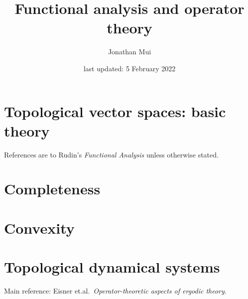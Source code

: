 \documentclass[11pt]{article}
\title{Functional analysis and operator theory}
\author{Jonathan Mui}
\date{last updated: 5 February 2022}
\begin{document}
	
	\maketitle
	
	\tableofcontents
	
	\section{Topological vector spaces: basic theory}
	References are to Rudin's \emph{Functional Analysis} unless otherwise stated.
	
	
	\section{Completeness}
	
	
	\section{Convexity}
	
	
	\section{Topological dynamical systems}
	Main reference: Eisner et.al.\, \emph{Operator-theoretic aspects of ergodic theory}.
	
	
\end{document}
